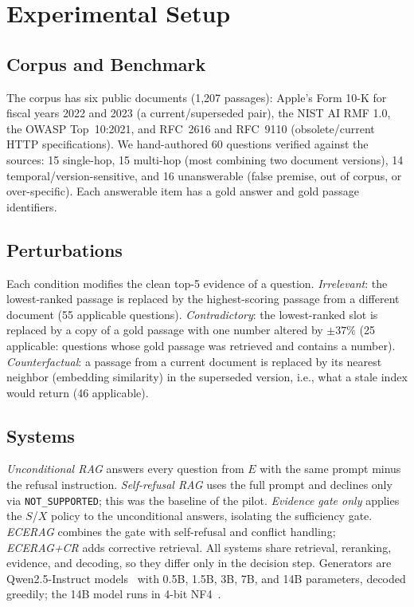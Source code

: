 \documentclass[conference,letterpaper]{IEEEtran}
\begin{document}
\section{Experimental Setup}\label{sec:setup}
\subsection{Corpus and Benchmark}
The corpus has six public documents (1{,}207 passages): Apple's Form 10-K for fiscal years 2022 and
2023 (a current/superseded pair), the NIST AI RMF 1.0, the OWASP Top~10:2021, and RFC~2616 and
RFC~9110 (obsolete/current HTTP specifications). We hand-authored 60 questions verified against
the sources: 15 single-hop, 15 multi-hop (most combining two document versions), 14
temporal/version-sensitive, and 16 unanswerable (false premise, out of corpus, or over-specific).
Each answerable item has a gold answer and gold passage identifiers.

\subsection{Perturbations}
Each condition modifies the clean top-5 evidence of a question. \emph{Irrelevant}: the
lowest-ranked passage is replaced by the highest-scoring passage from a different document (55
applicable questions). \emph{Contradictory}: the lowest-ranked slot is replaced by a copy of a gold
passage with one number altered by $\pm37\%$ (25 applicable: questions whose gold passage was
retrieved and contains a number). \emph{Counterfactual}: a passage from a current document is
replaced by its nearest neighbor (embedding similarity) in the superseded version, i.e., what a
stale index would return (46 applicable).

\subsection{Systems}
\emph{Unconditional RAG} answers every question from $E$ with the same prompt minus the refusal
instruction. \emph{Self-refusal RAG} uses the full prompt and declines only via
\texttt{NOT\_SUPPORTED}; this was the baseline of the pilot. \emph{Evidence gate only} applies the
$S$/$X$ policy to the unconditional answers, isolating the sufficiency gate. \emph{ECERAG} combines
the gate with self-refusal and conflict handling; \emph{ECERAG+CR} adds corrective retrieval. All
systems share retrieval, reranking, evidence, and decoding, so they differ only in the decision
step. Generators are Qwen2.5-Instruct models~\cite{qwen2024} with 0.5B, 1.5B, 3B, 7B, and 14B
parameters, decoded greedily; the 14B model runs in 4-bit NF4~\cite{dettmers2023qlora}.
\end{document}
